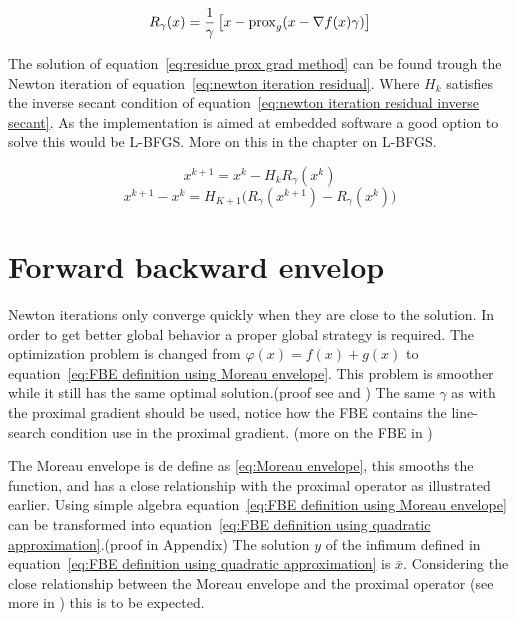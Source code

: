 			\begin{equation}
			R_{\gamma}(x)= \frac{1}{\gamma}\left[ x - \operatorname{prox}_g( x - \nabla f(x)\gamma) \right]
			\label{eq:residue prox grad method}
			\end{equation}
			
			The solution of equation~\ref{eq:residue prox grad method} can be found trough the Newton iteration of equation~\ref{eq:newton iteration residual}. Where $H_k$ satisfies the inverse secant condition of equation~\ref{eq:newton iteration residual inverse secant}. As the implementation is aimed at embedded software a good option to solve this would be L-BFGS. More on this in the chapter on L-BFGS.
			
			\begin{equation}
			x^{k+1} = x^k -H_kR_{\gamma}(x^k)
			\label{eq:newton iteration residual}
			\end{equation}
			\begin{equation}
			x^{k+1} - x^k = H_{K+1} \Big( R_{\gamma}(x^{k+1})- R_{\gamma}(x^k) \Big)
			\label{eq:newton iteration residual inverse secant}
			\end{equation}
		
	\section{Forward backward envelop}	
		Newton iterations only converge quickly when they are close to the solution. In order to get better global behavior a proper global strategy is required. The optimization problem is changed from $\varphi(x) = f(x) + g(x)$ to equation~\ref{eq:FBE definition using Moreau envelope}. This problem is smoother while it still has the same optimal solution.(proof see \cite{LorenzoStella2017} and \cite{Themelis}) The same $\gamma$ as with the proximal gradient should be used, notice how the FBE contains the line-search condition use in the proximal gradient. (more on the FBE in \cite{Themelis})
		
		The Moreau envelope is de define as \ref{eq:Moreau envelope}, this smooths the function, and has a close relationship with the proximal operator as illustrated earlier. Using simple algebra equation~\ref{eq:FBE definition using Moreau envelope} can be transformed into equation~\ref{eq:FBE definition using quadratic approximation}.(proof in Appendix) The solution $y$ of the infimum defined in equation~\ref{eq:FBE definition using quadratic approximation} is $\bar{x}$. Considering the close relationship between the Moreau envelope and the proximal operator (see more in \cite{Themelis}) this is to be expected.
		

